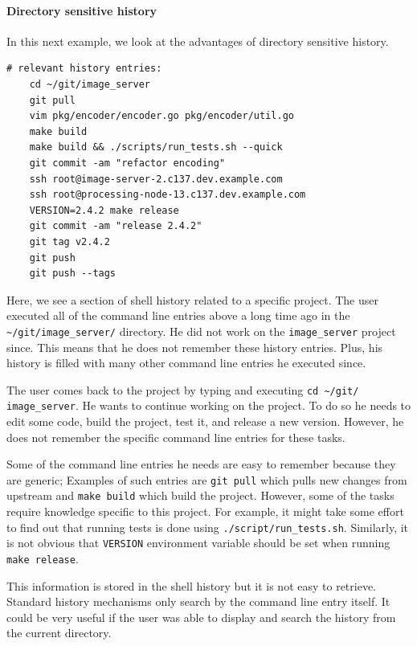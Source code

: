 \paragraph{Directory sensitive history}

In this next example, we look at the advantages of directory sensitive history.


\begin{verbatim}
# relevant history entries:
    cd ~/git/image_server
    git pull
    vim pkg/encoder/encoder.go pkg/encoder/util.go
    make build
    make build && ./scripts/run_tests.sh --quick
    git commit -am "refactor encoding"
    ssh root@image-server-2.c137.dev.example.com
    ssh root@processing-node-13.c137.dev.example.com
    VERSION=2.4.2 make release
    git commit -am "release 2.4.2"
    git tag v2.4.2
    git push
    git push --tags
\end{verbatim}

Here, we see a section of shell history related to a specific project. The user executed all of the command line entries above a long time ago in the \verb|~/git/image_server/| directory. He did not work on the \verb|image_server| project since. This means that he does not remember these history entries. Plus, his history is filled with many other command line entries he executed since.

The user comes back to the project by typing and executing \verb|cd ~/git/| \verb|image_server|. He wants to continue working on the project. To do so he needs to edit some code, build the project, test it, and release a new version. However, he does not remember the specific command line entries for these tasks. 

Some of the command line entries he needs are easy to remember because they are generic; Examples of such entries are \verb|git pull| which pulls new changes from upstream and \verb|make build| which build the project. However, some of the tasks require knowledge specific to this project. For example, it might take some effort to find out that running tests is done using \verb|./script/run_tests.sh|. Similarly, it is not obvious that \verb|VERSION| environment variable should be set when running \verb|make release|.

This information is stored in the shell history but it is not easy to retrieve. Standard history mechanisms only search by the command line entry itself. It could be very useful if the user was able to display and search the history from the current directory.


